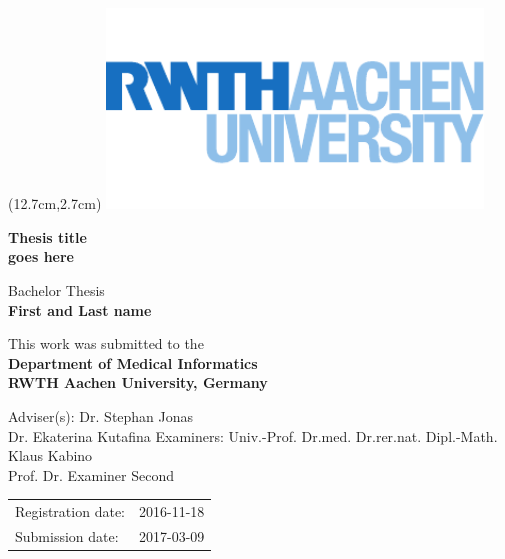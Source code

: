 
\titlehead{
} %


\begin{titlepage}

\begin{textblock*}{10cm} (12.7cm,2.7cm)
\includegraphics[width=10cm,keepaspectratio]{logos/rwth}
\end{textblock*}

\let\footnotesize\small \let\footnoterule\relax

\hbox{}
\vfill

\centering

\begin{doublespace} 
{ \huge\sffamily\textbf{Thesis title \\ \vspace{-0.7em}
goes here\\ \vspace{0.2em}
}}
\end{doublespace}
\vskip 2cm

{\large\sffamily

Bachelor Thesis\\[5pt]
\textbf{First and Last name}
\vskip 1cm

This work was submitted to the\\[5pt]
\textbf{Department of Medical Informatics\\[5pt]
        RWTH Aachen University, Germany}
\vskip 2cm

Adviser(s):
\vskip 2mm
Dr. Stephan Jonas\\
Dr. Ekaterina Kutafina
\vskip 5mm
Examiners:
\vskip 2mm
Univ.-Prof. Dr.med. Dr.rer.nat. Dipl.-Math. Klaus Kabino\\
Prof. Dr. Examiner Second
\vskip 1cm

\begin{tabular}{R{6cm}p{6cm}}
Registration date:  & 2016-11-18 \\
Submission date:    & 2017-03-09 \\
\end{tabular}

} %

\vfill

\end{titlepage}
